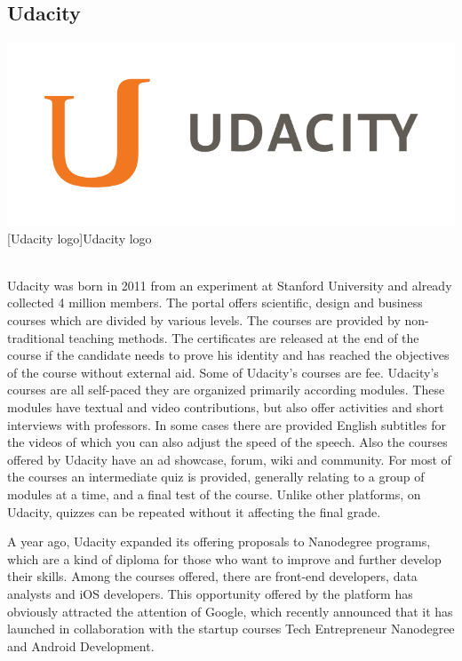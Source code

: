 \subsection{Udacity}
\label{subsec:udacity}

\begin{minipage}{\linewidth}
      \centering
      \includegraphics[width=0.5\linewidth]{images/chapter1/udacity.png}
      [Udacity logo]{Udacity logo}
  \end{minipage}
  \\


Udacity was born in 2011 from an experiment at Stanford University and already collected 4 million members. The portal offers scientific, design and business courses which are divided by various levels. The courses are provided by non-traditional teaching methods.
The certificates are released at the end of the course if the candidate needs to prove his identity and has reached the objectives of the course without external aid. Some of Udacity's courses are fee.
Udacity’s courses are all self-paced they are organized primarily according modules. These modules have textual and video contributions, but also offer activities and short interviews with professors. In some cases there are provided English subtitles for the videos of which you can also adjust the speed of the speech.
Also the courses offered by Udacity have an ad showcase, forum, wiki and community. For most of the courses an intermediate quiz is provided, generally relating to a group of modules at a time, and a final test of the course. Unlike other platforms, on Udacity, quizzes can be repeated without it affecting the final grade.

A year ago, Udacity expanded its offering proposals to Nanodegree programs, which are a kind of diploma for those who want to improve and further develop their skills. Among the courses offered, there are front-end developers, data analysts and iOS developers. This opportunity offered by the platform has obviously attracted the attention of Google, which recently announced that it has launched in collaboration with the startup courses Tech Entrepreneur Nanodegree and Android Development.

